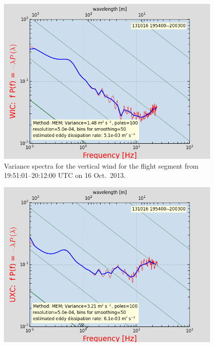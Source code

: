 \documentclass[12pt,twoside,english]{article}\usepackage[]{graphicx}\usepackage[]{color}
\let\OrgIndex\index
\renewcommand*{\index}[1]{\OrgIndex{#1}}
\begin{document}
{{

\begin{figure}
\noindent \begin{centering}
\includegraphics[height=0.4\textheight]{SpecialGraphics/PSD1.png}  
\par\end{centering}

\protect\protect\protect\caption{\label{fig:AppxB-PSD1}Variance spectra for the vertical wind for the flight segment from 19:51:01--20:12:00 UTC on 16 Oct.\ 2013.} 
\end{figure}
\begin{figure}
\noindent \begin{centering}
\includegraphics[height=0.4\textheight]{SpecialGraphics/PSD2.png}  
\par\end{centering}


\end{figure}}}
\end{document}
